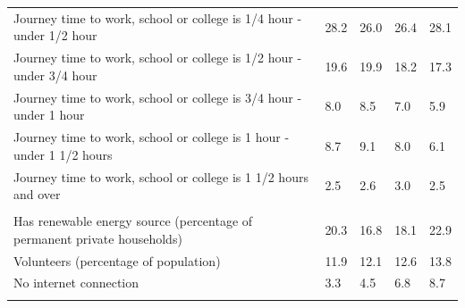 \documentclass{article}
\begin{document}
\begin{table}[h]
\begin{tabular}{KTTTT}
Journey time to work, school or college is 1/4 hour - under 1/2 hour & 28.2& 26.0& 26.4& 28.1\\
Journey time to work, school or college is 1/2 hour - under 3/4 hour & 19.6& 19.9& 18.2& 17.3\\
Journey time to work, school or college is 3/4 hour - under 1 hour & 8.0& 8.5& 7.0& 5.9\\
Journey time to work, school or college is 1 hour - under 1 1/2 hours & 8.7& 9.1& 8.0& 6.1\\
Journey time to work, school or college is 1 1/2 hours and over & 2.5& 2.6& 3.0& 2.5\\
\hline
    \\ 
    \hline
Has renewable energy source (percentage of permanent private households) & 20.3& 16.8& 18.1& 22.9\\
    \hline
Volunteers (percentage of population) & 11.9& 12.1& 12.6& 13.8\\
    \hline
No internet connection& 3.3& 4.5& 6.8& 8.7\\
\hline
\end{tabular}
\end{table}
\end{document}
